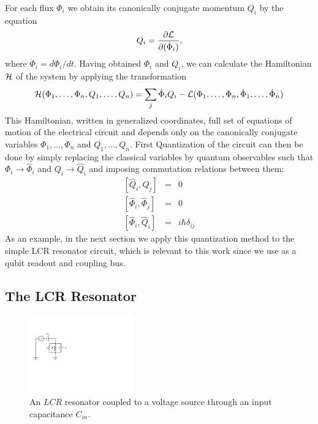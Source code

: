 %
For each flux $\Phi_i$ we obtain its canonically conjugate momentum $Q_i$ by the equation
%
\begin{equation}
Q_i = \frac{\partial \begin{mathcal}L\end{mathcal}}{\partial(\dot{\Phi}_i)}, \label{eq:canonical_momentum}
\end{equation}
%
where $\dot{\Phi}_i=d\Phi_i/dt$. Having obtained $\Phi_i$ and $Q_i$, we can calculate the Hamiltonian $\begin{mathcal}H\end{mathcal}$ of the system by applying the transformation
%
\begin{equation}
\begin{mathcal}H\end{mathcal}(\Phi_1,\hdots,\Phi_n,Q_1,\hdots,Q_n) = \sum\limits_j \dot{\Phi}_i Q_i - \begin{mathcal}L\end{mathcal}(\Phi_1,\hdots,\Phi_n,\dot{\Phi}_1,\hdots,\dot{\Phi}_n) \label{eq:l_to_h}
\end{equation}
%
This Hamiltonian, written in generalized coordinates, full set of equations of motion of the electrical circuit and depends only on the canonically conjugate variables $\Phi_{1},\hdots,\Phi_n$ and $Q_1,\hdots,Q_n$. First Quantization of the circuit can then be done by simply replacing the classical variables by quantum observables such that $\Phi_i\to\hat{\Phi}_i$ and $Q_i\to\hat{Q}_i$ and imposing commutation relations between them:
%
\begin{eqnarray}
\left[\hat{Q}_i,\hat{Q}_j\right] & = & 0 \\
\left[\hat{\Phi}_i,\hat{\Phi}_j \right] & = & 0 \\
\left[\hat{\Phi}_i,\hat{Q}_i\right] & = & i\hbar\delta_{ij} \label{eq:quantization_commutation_relations}
\end{eqnarray}
%
As an example, in the next section we apply this quantization method to the simple LCR resonator circuit, which is relevant to this work since we use as a qubit readout and coupling bus.

\subsection{The LCR Resonator}

\begin{figure}
	\centering
	\includegraphics[width=0.4\textwidth]{"./material/figures/introduction/lcr_resonator"}
	\caption[]{An $LCR$ resonator coupled to a voltage source through an input capacitance $C_{in}$.}
	\label{fig:lcr_resonator}
\end{figure}

